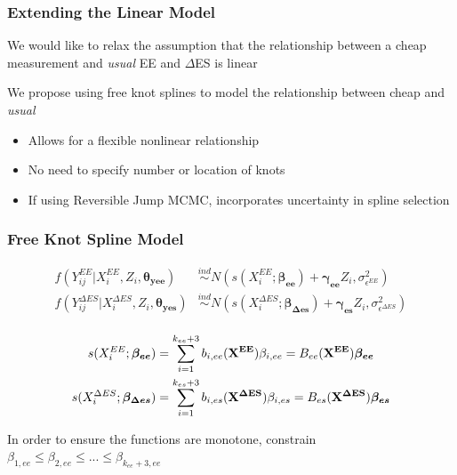 \documentclass[handout]{beamer}\usepackage[]{graphicx}\usepackage[]{color}
\begin{document}
\begin{frame}
\frametitle{Extending the Linear Model}
We would like to relax the assumption that the relationship between a cheap measurement and \emph{usual} EE and $\Delta$ES is linear \\

\vspace{0.5cm}

We propose using free knot splines to model the relationship between cheap and \emph{usual}

\begin{itemize}
\item
Allows for a flexible nonlinear relationship
\item
No need to specify number or location of knots
\item
If using Reversible Jump MCMC, incorporates uncertainty in spline selection

\end{itemize}


\end{frame}


\begin{frame}
\frametitle{Free Knot Spline Model}

\begin{align*}
  f(Y_{ij}^{EE}|X_i^{EE},Z_i,\boldsymbol{\theta_{yee}}) &\overset{ind}{\sim} N(s(X_i^{EE};\boldsymbol{\beta_{ee}}) + \boldsymbol{\gamma_{ee}}Z_i,\sigma_{\epsilon^{EE}}^2) \\
    f(Y_{ij}^{\Delta ES}|X_i^{\Delta ES},Z_i,\boldsymbol{\theta_{yes}}) &\overset{ind}{\sim} N(s(X_i^{\Delta ES};\boldsymbol{\beta_{\Delta es}}) + \boldsymbol{\gamma_{es}}Z_i,\sigma_{\epsilon^{\Delta ES}}^2) \\
\end{align*}

\begin{align*}
  s(X_i^{EE};\boldsymbol{\beta_{ee}}) &= \sum_{i=1}^{k_{ee}+3} b_{i,ee}({\bf X^{EE}}) \beta_{i,ee} = B_{ee}({\bf X^{EE}}) \boldsymbol{\beta_{ee}}\\
  s(X_i^{\Delta ES};\boldsymbol{\beta_{\Delta es}}) &= \sum_{i=1}^{k_{es}+3} b_{i,es}({\bf X^{\Delta ES}}) \beta_{i,es} = B_{es}({\bf X^{\Delta ES}}) \boldsymbol{\beta_{es}}
\end{align*}

In order to ensure the functions are monotone, constrain $\beta_{1,ee} \leq \beta_{2,ee} \leq ... \leq \beta_{k_{ee}+3,ee}$ 

% 
% 

\end{frame}
\end{document}
